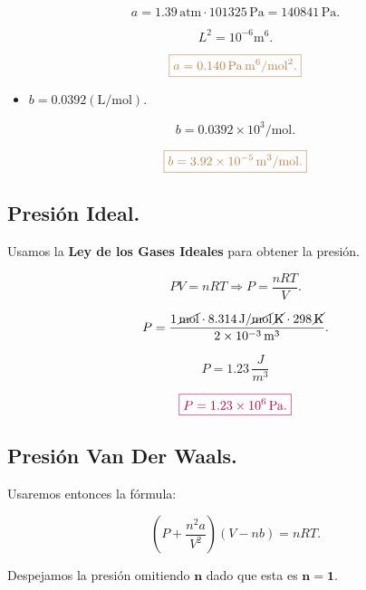\documentclass[a4paper,12pt]{article} %
\begin{document}
\[ a = 1.39 \, \mathrm{atm} \cdot 101325 \, \mathrm{Pa} = 140841 \, \mathrm{Pa}.  \]

\[ L^2 = 10^{-6} \mathrm{m}^6. \]

\[ \textcolor{brown}{\boxed{ a = 0.140 \, \mathrm{Pa} \, \mathrm{m}^6 / \mathrm{mol}^2.}} \]

\vspace{\baselineskip}

\begin{itemize}
	\item \( b = 0 .0392 \left( \mathrm{L} / \mathrm{mol} \right) . \)
\end{itemize}

\[ b = 0.0392 \times 10^{3} / \mathrm{mol}. \]

\[ \textcolor{brown}{\boxed{ b = 3.92 \times 10^{-5} \, \mathrm{m}^3 / \mathrm{mol}. } } \]

\subsection{Presión Ideal.}

\begin{justify}
	Usamos la \textbf{Ley de los Gases Ideales} para obtener la presión.
\end{justify}

\[ PV = nRT \Rightarrow P = \frac{nRT}{V}. \]

\[ P = \frac{ 1 \, \cancel{\mathrm{mol}} \cdot 8.314 \, \mathrm{J} / \cancel{\mathrm{mol}} \, \cancel{\mathrm{K}} \cdot 298 \, \cancel{\mathrm{K}} }{2 \times 10^{-3} \, \mathrm{m}^3 }. \]

\[ P = 1.23 \, \frac{J}{m^3} \]

\[ \textcolor{purple}{\boxed{ P = 1.23 \times 10^6 \, \mathrm{Pa}. }} \]

\vspace{\baselineskip}

\subsection{Presión Van Der Waals.}

\begin{justify}
	Usaremos entonces la fórmula:
\end{justify}

\[ \left( P + \frac{n^2 a}{V^2} \right) \left( V - n b \right) = nRT. \]

\begin{justify}
	Despejamos la presión omitiendo \(\mathbf{n}\) dado que esta es  \( \mathbf{n = 1}\). 
\end{justify}
\end{document}
